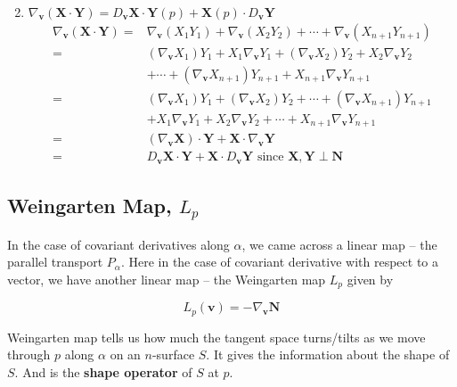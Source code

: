 \begin{enumerate}
\begin{align*}
	\end{align*}
	\item $\nabla_{\boldsymbol{v}} (\boldsymbol{X} \cdot \boldsymbol{Y}) = D_{\boldsymbol{v}} \boldsymbol{X} \cdot \boldsymbol{Y}(p) + \boldsymbol{X}(p) \cdot D_{\boldsymbol{v}} \boldsymbol{Y} $
	\begin{align*}
		\nabla_{\boldsymbol{v}}(\boldsymbol{X} \cdot \boldsymbol{Y}) = & \nabla_{\boldsymbol{v}} (X_1Y_1) + \nabla_{\boldsymbol{v}} (X_2Y_2) + \dotsb + \nabla_{\boldsymbol{v}} (X_{n+1}Y_{n+1}) \\
		= & (\nabla_{\boldsymbol{v}} X_1)Y_1 + X_1\nabla_{\boldsymbol{v}} Y_1 + (\nabla_{\boldsymbol{v}} X_2)Y_2 + X_2\nabla_{\boldsymbol{v}} Y_2 \\ 
		& + \dotsb + (\nabla_{\boldsymbol{v}} X_{n+1})Y_{n+1} + X_{n+1}\nabla_{\boldsymbol{v}} Y_{n+1} \\
		= & (\nabla_{\boldsymbol{v}} X_1)Y_1 + (\nabla_{\boldsymbol{v}} X_2)Y_2+ \dotsb + (\nabla_{\boldsymbol{v}} X_{n+1})Y_{n+1} \\
		& + X_1\nabla_{\boldsymbol{v}} Y_1 + X_2 \nabla_{\boldsymbol{v}} Y_2 + \dotsb + X_{n+1} \nabla_{\boldsymbol{v}} Y_{n+1} \\
		= &  (\nabla_{\boldsymbol{v}} \boldsymbol{X}) \cdot \boldsymbol{Y} + \boldsymbol{X} \cdot \nabla_{\boldsymbol{v}} \boldsymbol{Y} \\
		= & D_{\boldsymbol{v}} \boldsymbol{X} \cdot \boldsymbol{Y} + \boldsymbol{X} \cdot D_{\boldsymbol{v}} \boldsymbol{Y} \text{ since } \boldsymbol{X},\boldsymbol{Y} \perp \boldsymbol{N}
	\end{align*}
\end{enumerate}

\subsection{Weingarten Map, $L_p$}
	In the case of covariant derivatives along $\alpha$, we came across a linear map -- the parallel transport $P_\alpha$.
	Here in the case of covariant derivative with respect to a vector, we have another linear map -- the  Weingarten map $L_p$ given by

\begin{equation}
	L_p(\boldsymbol{v}) = -\nabla_{\boldsymbol{v}} \boldsymbol{N}
\end{equation}
	
	Weingarten map tells us how much the tangent space turns/tilts as we move through $p$ along $\alpha$ on an $n$-surface $S$.
	It gives the information about the shape of $S$.
	And is the \textbf{shape operator} of $S$ at $p$.

